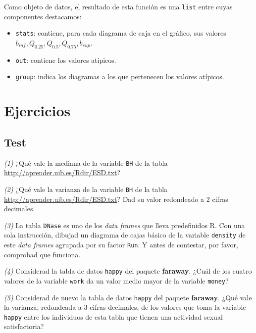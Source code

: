 \documentclass[
]{book}
\theoremstyle{definition}
\theoremstyle{definition}
\theoremstyle{definition}
\theoremstyle{remark}
\begin{document}
\begin{itemize}
  Como objeto de datos, el resultado de esta función es una \texttt{list} entre cuyas componentes destacamos:

  \begin{itemize}
  \item
    \texttt{stats}: contiene, para cada diagrama de caja en el gráfico, sus valores
    \(b_{inf}, Q_{0.25}, Q_{0.5}, Q_{0.75}, b_{sup}\).
  \item
    \texttt{out}: contiene los valores atípicos.
  \item
    \texttt{group}: indica los diagramas a los que pertenecen los valores atípicos.
  \end{itemize}
\end{itemize}

\hypertarget{ejercicios-10}{%
\section{Ejercicios}\label{ejercicios-10}}

\hypertarget{test-9}{%
\subsection*{Test}\label{test-9}}

\emph{(1)} ¿Qué vale la mediana de la variable \texttt{BH} de la tabla \url{http://aprender.uib.es/Rdir/ESD.txt}?

\emph{(2)} ¿Qué vale la varianza de la variable \texttt{BH} de la tabla \url{http://aprender.uib.es/Rdir/ESD.txt}? Dad su valor redondeado a 2 cifras decimales.

\emph{(3)} La tabla \texttt{DNase} es uno de los \emph{data frames} que lleva predefinidos R. Con una sola instrucción, dibujad un diagrama de cajas básico de la variable \texttt{density} de este \emph{data frames} agrupada por su factor \texttt{Run}. Y antes de contestar, por favor, comprobad que funciona.

\emph{(4)} Considerad la tabla de datos \texttt{happy} del paquete \textbf{faraway}. ¿Cuál de los cuatro valores de la variable \texttt{work} da un valor medio mayor de la variable \texttt{money}?

\emph{(5)} Considerad de nuevo la tabla de datos \texttt{happy} del paquete \textbf{faraway}. ¿Qué vale la varianza, redondeada a 3 cifras decimales, de los valores que toma la variable \texttt{happy} entre los individuos de esta tabla que tienen una actividad sexual satisfactoria?
\end{document}
